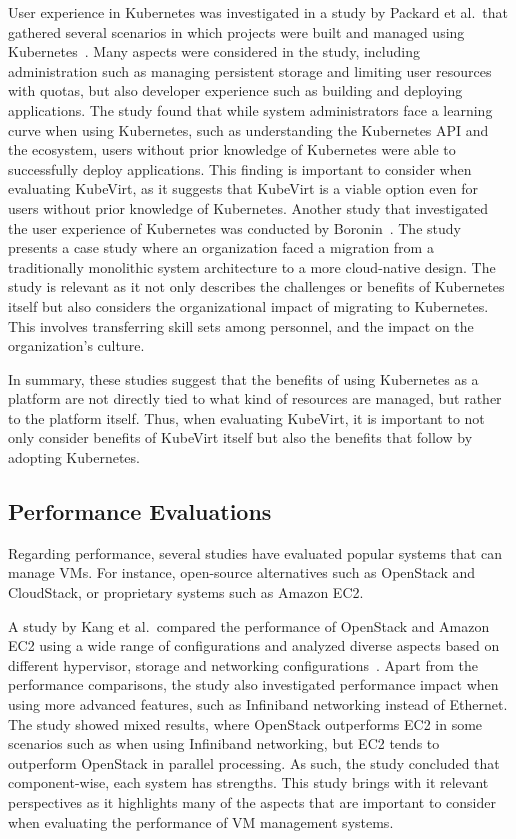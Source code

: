 \documentclass{article}
\begin{document}
User experience in Kubernetes was investigated in a study by Packard et al.\ that gathered several scenarios in which projects were built and managed using Kubernetes\ \cite{k8s-user-experience}. Many aspects were considered in the study, including administration such as managing persistent storage and limiting user resources with quotas, but also developer experience such as building and deploying applications. The study found that while system administrators face a learning curve when using Kubernetes, such as understanding the Kubernetes API and the ecosystem, users without prior knowledge of Kubernetes were able to successfully deploy applications. This finding is important to consider when evaluating KubeVirt, as it suggests that KubeVirt is a viable option even for users without prior knowledge of Kubernetes. Another study that investigated the user experience of Kubernetes was conducted by Boronin\ \cite{k8s-migration-king}. The study presents a case study where an organization faced a migration from a traditionally monolithic system architecture to a more cloud-native design. The study is relevant as it not only describes the challenges or benefits of Kubernetes itself but also considers the organizational impact of migrating to Kubernetes. This involves transferring skill sets among personnel, and the impact on the organization's culture.

In summary, these studies suggest that the benefits of using Kubernetes as a platform are not directly tied to what kind of resources are managed, but rather to the platform itself. Thus, when evaluating KubeVirt, it is important to not only consider benefits of KubeVirt itself but also the benefits that follow by adopting Kubernetes. 

\subsection{Performance Evaluations}
Regarding performance, several studies have evaluated popular systems that can manage VMs. For instance, open-source alternatives such as OpenStack and CloudStack, or proprietary systems such as Amazon EC2. 

A study by Kang et al.\ compared the performance of OpenStack and Amazon EC2 using a wide range of configurations and analyzed diverse aspects based on different hypervisor, storage and networking configurations\ \cite{openstack-ec2-comparison}. Apart from the performance comparisons, the study also investigated performance impact when using more advanced features, such as Infiniband networking instead of Ethernet. The study showed mixed results, where OpenStack outperforms EC2 in some scenarios such as when using Infiniband networking, but EC2 tends to outperform OpenStack in parallel processing. As such, the study concluded that component-wise, each system has strengths. This study brings with it relevant perspectives as it highlights many of the aspects that are important to consider when evaluating the performance of VM management systems.
\end{document}
